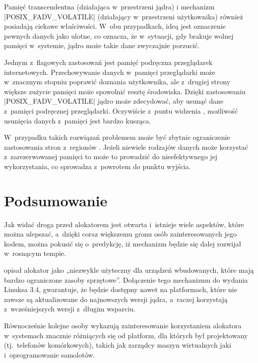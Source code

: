 Pamięć transcendentna \autocite{bib:transcendent} (działająca
w~przestrzeni jądra) i mechanizm \code|POSIX_FADV_VOLATILE|
\autocite{bib:fadv-volatile} (działający w~przestrzeni użytkownika)
również posiadają ciekawe właściwości.  W~obu przypadkach, ideą jest
oznaczenie pewnych danych jako ulotne, co oznacza, że w~sytuacji, gdy
brakuje wolnej pamięci w~systemie, jądro może takie dane zwyczajnie
porzucić.

Jednym z~flagowych zastosowań jest pamięć podręczna przeglądarek
internetowych.  Przechowywanie danych w~pamięci przeglądarki może
w~znacznym stopniu poprawić doznania użytkownika, ale z~drugiej strony
większe zużycie pamięci może spowolnić resztę środowiska.  Dzięki
zastosowaniu \code|POSIX_FADV_VOLATILE| jądro może zdecydować, aby
usunąć dane z~pamięci podręcznej przeglądarki.  Oczywiście z~puntu
widzenia , możliwość usunięcia danych z~pamięci jest bardzo
kusząca.

W~przypadku takich rozwiązań problemem może być zbytnie ograniczenie
zastosowania stron z~regionów .  Jeżeli niewiele rodzajów danych
może korzystać z~zarezerwowanej pamięci to może to prowadzić do
nieefektywnego jej wykorzystania, co sprowadza  z~powrotem do
punktu wyjścia.

\section{Podsumowanie}

Jak widać droga przed alokatorem  jest otwarta i~istnieje
wiele aspektów, które można ulepszać, a~dzięki coraz większemu gronu
osób zainteresowanych jego kodem, można pokusić się o~predykcję, iż
mechanizm  będzie się dalej rozwijał w~rosnącym tempie.

\textcite{bib:ltsi-34} opisał alokator  jako „niezwykle
użyteczny dla urządzeń wbudowanych, które mają bardzo ograniczone
zasoby sprzętowe”.  Dołączenie tego mechanizmu do wydania 
Linuksa 3.4, gwarantuje, że będzie dostępny nawet na platformach,
które nie zawsze są aktualizowane do najnowszych wersji jądra,
a~raczej korzystają z~wcześniejszych wersji z~długim wsparciu.

Równocześnie kolejne osoby wykazują zainteresowanie korzystaniem
alokatora  w~systemach znacznie różniących się od platform,
dla których był projektowany (tj.\ telefonów komórkowych), takich jak
zarządcy maszyn wirtualnych jaki i~oprogramowanie samolotów.
